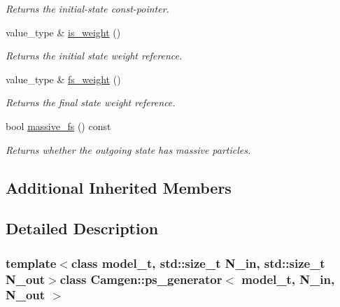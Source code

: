 \begin{DoxyCompactItemize}
\begin{DoxyCompactList}\small\item\em Returns the initial-\/state const-\/pointer. \end{DoxyCompactList}\item 
\hypertarget{a00450_afb1a4d1b876aa64808d1cff9abcbcb06}{}value\+\_\+type \& \hyperlink{a00450_afb1a4d1b876aa64808d1cff9abcbcb06}{is\+\_\+weight} ()\label{a00450_afb1a4d1b876aa64808d1cff9abcbcb06}

\begin{DoxyCompactList}\small\item\em Returns the initial state weight reference. \end{DoxyCompactList}\item 
\hypertarget{a00450_af0fca47abf3f8f4d8d21d45585dea6dd}{}value\+\_\+type \& \hyperlink{a00450_af0fca47abf3f8f4d8d21d45585dea6dd}{fs\+\_\+weight} ()\label{a00450_af0fca47abf3f8f4d8d21d45585dea6dd}

\begin{DoxyCompactList}\small\item\em Returns the final state weight reference. \end{DoxyCompactList}\item 
\hypertarget{a00450_a5797dbb7867e286f1ba35abc404e4157}{}bool \hyperlink{a00450_a5797dbb7867e286f1ba35abc404e4157}{massive\+\_\+fs} () const \label{a00450_a5797dbb7867e286f1ba35abc404e4157}

\begin{DoxyCompactList}\small\item\em Returns whether the outgoing state has massive particles. \end{DoxyCompactList}\end{DoxyCompactItemize}
\subsection*{Additional Inherited Members}


\subsection{Detailed Description}
\subsubsection*{template$<$class model\+\_\+t, std\+::size\+\_\+t N\+\_\+in, std\+::size\+\_\+t N\+\_\+out$>$class Camgen\+::ps\+\_\+generator$<$ model\+\_\+t, N\+\_\+in, N\+\_\+out $>$}

